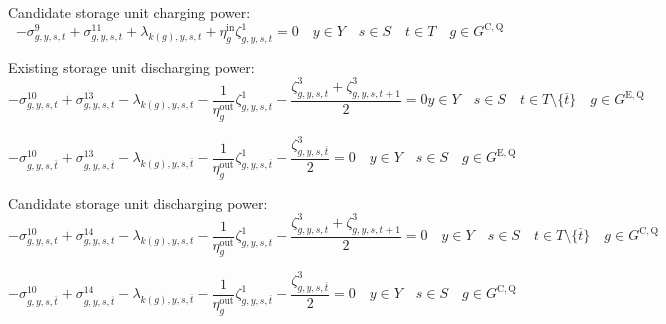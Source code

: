 \documentclass{article}
\newcommand{\sStorageExisting}{G^{\mathrm{E,Q}}}
\newcommand{\sStorageCandidate}{G^{\mathrm{C,Q}}}
\newcommand{\sYears}{Y}
\newcommand{\sScenarios}{S}
\newcommand{\sIntervals}{T}
\newcommand{\iGenerator}{g}
\newcommand{\iYear}{y}
\newcommand{\iScenario}{s}
\newcommand{\iInterval}{t}
\newcommand{\iIntervalTerminal}{\overline{\iInterval}}
\newcommand{\iZone}{z}
\newcommand{\cStorageUnitEfficiencyCharging}{\eta_{\iGenerator}^{\mathrm{in}}}
\newcommand{\cStorageUnitEfficiencyDischarging}{\eta_{\iGenerator}^{\mathrm{out}}}
\newcommand{\dNonNegativeCharging}[1][\iGenerator,\iYear,\iScenario,\iInterval]{\sigma_{#1}^{9}}
\newcommand{\dNonNegativeDischarging}[1][\iGenerator,\iYear,\iScenario,\iInterval]{\sigma_{#1}^{10}}
\newcommand{\dMaxChargingRateExisting}[1][\iGenerator,\iYear,\iScenario,\iInterval]{\sigma_{#1}^{11}}
\newcommand{\dMaxDischargingRateExisting}[1][\iGenerator,\iYear,\iScenario,\iInterval]{\sigma_{#1}^{13}}
\newcommand{\dMaxDischargingRateCandidate}[1][\iGenerator,\iYear,\iScenario,\iInterval]{\sigma_{#1}^{14}}
\newcommand{\dPowerBalance}[1][\iZone,\iYear,\iScenario,\iInterval]{\lambda_{#1}}
\newcommand{\dStorageEnergyTransition}[1][\iGenerator,\iYear,\iScenario,\iInterval]{\zeta_{#1}^{1}}
\newcommand{\dStorageEnergyOutput}[1][\iGenerator,\iYear,\iScenario,\iInterval]{\zeta_{#1}^{3}}
\begin{document}
Candidate storage unit charging power:
\begin{equation}
- \dNonNegativeCharging + \dMaxChargingRateExisting + \dPowerBalance[k(\iGenerator),\iYear,\iScenario,\iInterval] + \cStorageUnitEfficiencyCharging\dStorageEnergyTransition = 0 \quad \iYear \in \sYears \quad \iScenario \in \sScenarios \quad \iInterval \in \sIntervals \quad \iGenerator \in \sStorageCandidate
\end{equation}

Existing storage unit discharging power:
\begin{equation}
- \dNonNegativeDischarging + \dMaxDischargingRateExisting - \dPowerBalance[k(\iGenerator),\iYear,\iScenario,\iInterval] - \frac{1}{\cStorageUnitEfficiencyDischarging} \dStorageEnergyTransition - \frac{\dStorageEnergyOutput + \dStorageEnergyOutput[\iGenerator,\iYear,\iScenario,\iInterval+1]}{2} = 0 \iYear \in \sYears \quad \iScenario \in \sScenarios \quad \iInterval \in \sIntervals \setminus \{\iIntervalTerminal\} \quad \iGenerator \in \sStorageExisting
\end{equation}

\begin{equation}
- \dNonNegativeDischarging[\iGenerator,\iYear,\iScenario,\iIntervalTerminal] + \dMaxDischargingRateExisting[\iGenerator,\iYear,\iScenario,\iIntervalTerminal] - \dPowerBalance[k(\iGenerator),\iYear,\iScenario,\iIntervalTerminal] - \frac{1}{\cStorageUnitEfficiencyDischarging} \dStorageEnergyTransition[\iGenerator,\iYear,\iScenario,\iIntervalTerminal] - \frac{\dStorageEnergyOutput[\iGenerator,\iYear,\iScenario,\iIntervalTerminal]}{2} = 0 \quad \iYear \in \sYears \quad \iScenario \in \sScenarios \quad \iGenerator \in \sStorageExisting
\end{equation}

Candidate storage unit discharging power:
\begin{equation}
- \dNonNegativeDischarging + \dMaxDischargingRateCandidate - \dPowerBalance[k(\iGenerator),\iYear,\iScenario,\iInterval] - \frac{1}{\cStorageUnitEfficiencyDischarging} \dStorageEnergyTransition - \frac{\dStorageEnergyOutput + \dStorageEnergyOutput[\iGenerator,\iYear,\iScenario,\iInterval+1]}{2} = 0 \quad \iYear \in \sYears \quad \iScenario \in \sScenarios \quad \iInterval \in \sIntervals \setminus \{\iIntervalTerminal\} \quad \iGenerator \in \sStorageCandidate
\end{equation}

\begin{equation}
- \dNonNegativeDischarging[\iGenerator,\iYear,\iScenario,\iIntervalTerminal] + \dMaxDischargingRateCandidate[\iGenerator,\iYear,\iScenario,\iIntervalTerminal] - \dPowerBalance[k(\iGenerator),\iYear,\iScenario,\iIntervalTerminal] - \frac{1}{\cStorageUnitEfficiencyDischarging} \dStorageEnergyTransition[\iGenerator,\iYear,\iScenario,\iIntervalTerminal] - \frac{\dStorageEnergyOutput[\iGenerator,\iYear,\iScenario,\iIntervalTerminal]}{2} = 0 \quad \iYear \in \sYears \quad \iScenario \in \sScenarios \quad \iGenerator \in \sStorageCandidate
\end{equation}
\end{document}
